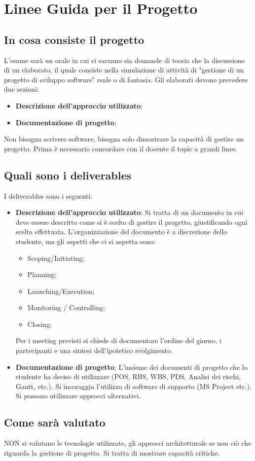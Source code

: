 \section{Linee Guida per il Progetto}
\subsection{In cosa consiste il progetto}
L'esame sarà un orale in cui ci saranno sia domande di teoria che la discussione di un elaborato, il quale consiste nella simulazione di attività di "gestione di un progetto di sviluppo software" reale o di fantasia.\newline
Gli elaborati devono prevedere due sezioni:
\begin{itemize}
	\item \textbf{Descrizione dell'approccio utilizzato};
	\item \textbf{Documentazione di progetto};
\end{itemize}
Non bisogna scrivere software, bisogna solo dimostrare la capacità di gestire un progetto. Prima è necessario concordare con il docente il topic a grandi linee.
\subsection{Quali sono i deliverables}
I deliverables sono i seguenti:
\begin{itemize}
	\item \textbf{Descrizione dell'approccio utilizzato}: Si tratta di un documento in cui deve essere descritto come si è scelto di gestire il progetto, giustificando ogni scelta effettuata. L'organizzazione del documento è a discrezione dello studente, ma gli aspetti che ci si aspetta sono:
	\begin{itemize}
		\item Scoping/Initiating;
		\item Planning;
		\item Launching/Execution;
		\item Monitoring / Controlling;
		\item Closing;
	\end{itemize}
	Per i meeting previsti si chiede di documentare l'ordine del giorno, i partecipanti e una sintesi dell'ipotetico svolgimento.
	\item \textbf{Documentazione di progetto}; L'insieme dei documenti di progetto che lo studente ha deciso di utilizzare (POS, RBS, WBS, PDS, Analisi dei rischi, Gantt, etc.).\newline
	Si incoraggia l'utilizzo di software di supporto (MS Project etc.). Si possono utilizzare approcci alternativi.
\end{itemize}
\subsection{Come sarà valutato}
NON si valutano le tecnologie utilizzate, gli approcci architetturale se non ciò che riguarda la gestione di progetto. Si tratta di mostrare capacità critiche.
